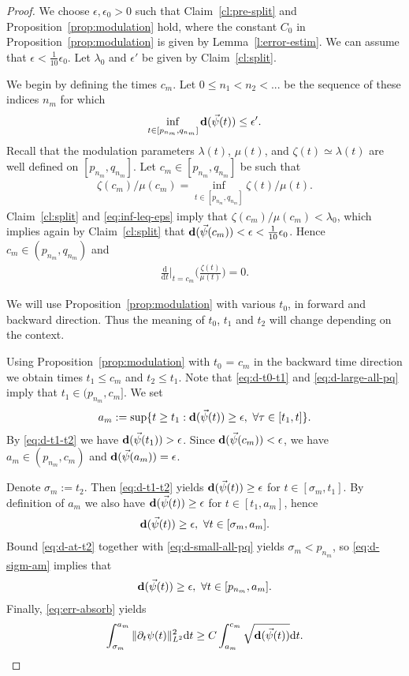\documentclass[10pt,reqno]{amsart}
\newcommand{\la}{\lambda}
\newcommand{\EQ}[1]{\begin{equation}\begin{split} #1 \end{split}\end{equation}}
\numberwithin{equation}{section}
\theoremstyle{remark}
\newcommand{\dd}[1]{\frac{\ud}{\ud{#1}}}
\newcommand{\ud}{\mathrm{d}}
\newcommand{\0}{\emptyset}
\newcommand{\eps}{\epsilon}
\newcommand{\bfd}{{\bf d}}
\begin{document}
\begin{proof}
We choose $\eps, \eps_0 > 0$ such that Claim~\ref{cl:pre-split}
and Proposition~\ref{prop:modulation} hold,
where the constant $C_0$ in Proposition~\ref{prop:modulation}
is given by Lemma~\ref{l:error-estim}.
We can assume that $\eps < \frac{1}{10}\eps_0$.
Let $\lambda_0$ and $\eps'$ be given by Claim~\ref{cl:split}.

We begin by defining the times $c_m$. Let $0 \leq n_1 < n_2 < ...$ be the sequence of
these indices $n_m$ for which
\EQ{\label{eq:inf-leq-eps}
\inf_{t\in[p_{n_m}, q_{n_m}]} \bfd(\vec\psi(t)) \leq \eps'.
}
Recall that the modulation parameters $\lambda(t)$, $\mu(t)$, and $\zeta(t) \simeq \la(t)$
are well defined on $[p_{n_m}, q_{n_m}]$.
Let $c_m \in [p_{n_m}, q_{n_m}]$ be such that
\EQ{
\zeta(c_m)/\mu(c_m) = \inf_{t \in [p_{n_m}, q_{n_m}]}\zeta(t)/\mu(t).
}
Claim~\ref{cl:split} and \eqref{eq:inf-leq-eps} imply that $\zeta(c_m) / \mu(c_m) < \lambda_0$,
which implies again by Claim~\ref{cl:split}
that $\bfd(\vec\psi(c_m)) < \eps < \frac{1}{10}\eps_0$.
Hence $c_m \in (p_{n_m}, q_{n_m})$ and
\EQ{
\dd{t}\Big|_{t = c_m}\Big(\frac{\zeta(t)}{\mu(t)}\Big) = 0.
}

We will use Proposition~\ref{prop:modulation} with various $t_0$, in forward and backward direction.
Thus the meaning of $t_0$, $t_1$ and $t_2$ will change depending on the context.

Using Proposition~\ref{prop:modulation} with $t_0$ = $c_m$ in the backward time direction
we obtain times $t_1 \leq c_m$ and $t_2 \leq t_1$.
Note that \eqref{eq:d-t0-t1} and \eqref{eq:d-large-all-pq} imply that $t_1 \in (p_{n_m}, c_m]$.
We set
\EQ{
a_m := \sup\{t \geq t_1: \bfd(\vec\psi(t)) \geq \eps,\ \forall \tau\in [t_1, t]\}.
}
By \eqref{eq:d-t1-t2} we have $\bfd(\vec\psi(t_1)) > \eps$.
Since $\bfd(\vec\psi(c_m)) < \eps$, we have $a_m \in (p_{n_m}, c_m)$
and $\bfd(\vec\psi(a_m)) = \eps$.

Denote $\sigma_m := t_2$. Then \eqref{eq:d-t1-t2} yields
$\bfd(\vec\psi(t)) \geq \eps$ for $t \in [\sigma_m, t_1]$.
By definition of $a_m$ we also have $\bfd(\vec\psi(t)) \geq \eps$ for $t \in [t_1, a_m]$, hence
\EQ{\label{eq:d-sigm-am}
\bfd(\vec\psi(t)) \geq \eps,\ \forall t \in [\sigma_m, a_m].
}
Bound \eqref{eq:d-at-t2} together with \eqref{eq:d-small-all-pq} yields $\sigma_m < p_{n_m}$,
so \eqref{eq:d-sigm-am} implies that
\EQ{\label{eq:d-pnm-am}
\bfd(\vec\psi(t)) \geq \eps,\ \forall t \in [p_{n_m}, a_m].
}
Finally, \eqref{eq:err-absorb} yields
\EQ{\label{eq:err-absorb-sig}
\int_{\sigma_m}^{a_m} \|\partial_t\psi(t)\|_{L^2}^2\ud t \geq C\int_{a_m}^{c_m}\sqrt{\bfd(\vec \psi(t))}\ud t.
}


\end{proof}
\end{document}
